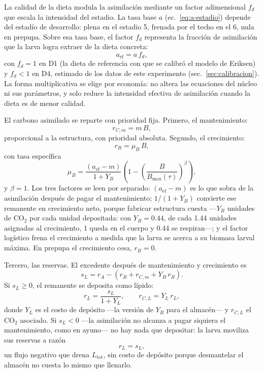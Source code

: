 La calidad de la dieta modula la asimilación mediante un factor adimensional $f_d$ que escala la intensidad del estadio. La tasa base $a$ (ec.~\ref{eq:a-estadio}) depende del estadío de desarrollo: plena en el estadio 5, frenada por el techo en el 6, nula en prepupa. Sobre esa tasa base, el factor $f_d$ representa la fracción de asimilación que la larva logra extraer de la dieta concreta:
\begin{equation}
  a_{\mathrm{ef}} = a\,f_d,
  \label{eq:aef}
\end{equation}
con $f_d = 1$ en D1 (la dieta de referencia con que se calibró el modelo de Eriksen) y $f_d < 1$ en D4, estimado de los datos de este experimento (sec.~\ref{sec:calibracion}). La forma multiplicativa se elige por economía: no altera las ecuaciones del núcleo ni sus parámetros, y solo reduce la intensidad efectiva de asimilación cuando la dieta es de menor calidad.

El carbono asimilado se reparte con prioridad fija. Primero, el mantenimiento:
\begin{equation}
  r_{C,m} = m\,B,
  \label{eq:mant}
\end{equation}
proporcional a la estructura, con prioridad absoluta. Segundo, el crecimiento:
\begin{equation}
  r_B = \mu_B\,B,
  \label{eq:crec}
\end{equation}
con tasa específica
\begin{equation}
  \mu_B = \frac{(a_{\mathrm{ef}} - m)}{1 + Y_B}\left(1 - \left(\frac{B}{B_{\max}(\tau)}\right)^{\beta}\right),
  \label{eq:muB}
\end{equation}
y $\beta = 1$. Los tres factores se leen por separado: $(a_{\mathrm{ef}} - m)$ es lo que sobra de la asimilación después de pagar el mantenimiento; $1/(1 + Y_B)$ convierte ese remanente en crecimiento neto, porque fabricar estructura cuesta ---$Y_B$ unidades de CO$_2$ por cada unidad depositada: con $Y_B = 0.44$, de cada 1.44 unidades asignadas al crecimiento, 1 queda en el cuerpo y 0.44 se respiran---; y el factor logístico frena el crecimiento a medida que la larva se acerca a su biomasa larval máxima. En prepupa el crecimiento cesa, $r_B = 0$.

Tercero, las reservas. El excedente después de mantenimiento y crecimiento es
\begin{equation}
  s_L = r_A - (r_B + r_{C,m} + Y_B\,r_B).
  \label{eq:excedente}
\end{equation}
Si $s_L \geq 0$, el remanente se deposita como lípido:
\begin{equation}
  r_L = \frac{s_L}{1 + Y_L}, \qquad r_{C,L} = Y_L\,r_L,
  \label{eq:lipidos-pos}
\end{equation}
donde $Y_L$ es el costo de depósito ---la versión de $Y_B$ para el almacén--- y $r_{C,L}$ el CO$_2$ asociado. Si $s_L < 0$ ---la asimilación no alcanza a pagar siquiera el mantenimiento, como en ayuno--- no hay nada que depositar: la larva moviliza sus reservas a razón
\begin{equation}
  r_L = s_L,
  \label{eq:lipidos-neg}
\end{equation}
un flujo negativo que drena $L_{\mathrm{tot}}$, sin costo de depósito porque desmantelar el almacén no cuesta lo mismo que llenarlo.


